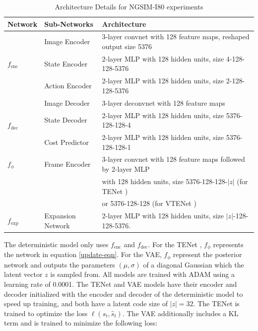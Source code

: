 \documentclass{article}
\newcommand{\modelname}{TENet }
\begin{document}
\begin{table}[h]
  \caption{Architecture Details for NGSIM-I80 experiments}
  \label{sample-table}
  \centering
  \begin{tabular}{lll}
    \toprule
    Network & Sub-Networks     & Architecture    \\
    \midrule
    \multirow{3}{*}{$f_\text{enc}$} & Image Encoder & 3-layer convnet with 128 feature maps, reshaped output size 5376 \\
    & State Encoder & 2-layer MLP with 128 hidden units, size 4-128-128-5376 \\
    & Action Encoder & 2-layer MLP with 128 hidden units, size 2-128-128-5376  \\
    \hline
        \multirow{3}{*}{$f_\text{dec}$} & Image Decoder & 3-layer deconvnet with 128 feature maps \\
    & State Decoder & 2-layer MLP with 128 hidden units, size 5376-128-128-4 \\
        & Cost Predictor & 2-layer MLP with 128 hidden units, size 5376-128-128-1 \\
    \hline
    $f_\phi$ & Frame Encoder & 3-layer convnet with 128 feature maps followed by 2-layer MLP \\ & & with 128 hidden units, size 5376-128-128-$|z|$ (for \modelname) \\
    &               & or 5376-128-128 (for V\modelname) \\
    \hline
    $f_\text{exp}$ & Expansion Network & 2-layer MLP with 128 hidden units, size $|z|$-128-128-5376. \\
    \hline
    \bottomrule
  \end{tabular}
\end{table}


The deterministic model only uses $f_\text{enc}$ and $f_\text{dec}$.
For the \modelname, $f_\phi$ represents the network in equation \ref{update-eqn}.
For the VAE, $f_\phi$ represent the posterior network and outputs the parameters $(\mu, \sigma)$ of a diagonal Gaussian which the latent vector $z$ is sampled from.
All models are trained with ADAM \citep{ADAM} using a learning rate of 0.0001.
The \modelname and VAE models have their encoder and decoder initialized with the encoder and decoder of the deterministic model to speed up training, and both have a latent code size of $|z|=32$.
The \modelname is trained to optimize the loss $\ell(s_t, \hat{s}_t)$.
The VAE additionally includes a KL term and is trained to minimize the following loss:
\end{document}
